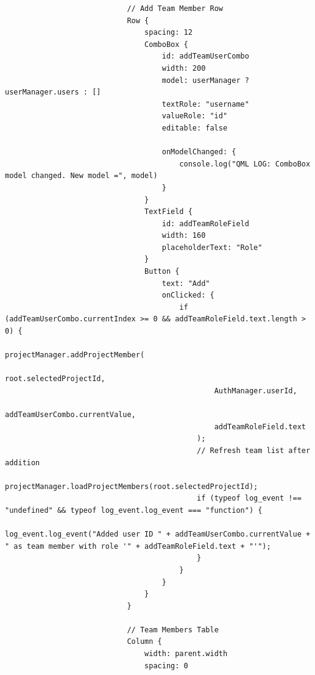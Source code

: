 \documentclass{report}
\begin{document}
\begin{lstlisting}
                            // Add Team Member Row
                            Row {
                                spacing: 12
                                ComboBox {
                                    id: addTeamUserCombo
                                    width: 200
                                    model: userManager ? userManager.users : []
                                    textRole: "username"
                                    valueRole: "id"
                                    editable: false

                                    onModelChanged: {
                                        console.log("QML LOG: ComboBox model changed. New model =", model)
                                    }
                                }
                                TextField {
                                    id: addTeamRoleField
                                    width: 160
                                    placeholderText: "Role"
                                }
                                Button {
                                    text: "Add"
                                    onClicked: {
                                        if (addTeamUserCombo.currentIndex >= 0 && addTeamRoleField.text.length > 0) {
                                            projectManager.addProjectMember(
                                                root.selectedProjectId,
                                                AuthManager.userId,
                                                addTeamUserCombo.currentValue,
                                                addTeamRoleField.text
                                            );
                                            // Refresh team list after addition
                                            projectManager.loadProjectMembers(root.selectedProjectId);
                                            if (typeof log_event !== "undefined" && typeof log_event.log_event === "function") {
                                                log_event.log_event("Added user ID " + addTeamUserCombo.currentValue + " as team member with role '" + addTeamRoleField.text + "'");
                                            }
                                        }
                                    }
                                }
                            }

                            // Team Members Table
                            Column {
                                width: parent.width
                                spacing: 0


\end{lstlisting}
\end{document}
